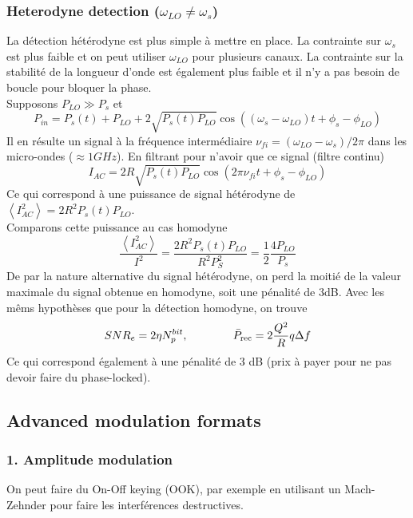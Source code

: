 \subsubsection{Heterodyne detection ($\omega_{LO}\neq\omega_s$)}
La détection hétérodyne est plus simple à mettre en place. La contrainte sur $\omega_s$ est plus
faible et on peut utiliser $\omega_{LO}$ pour plusieurs canaux. La contrainte sur la stabilité
de la longueur d'onde est également plus faible et il n'y a pas besoin de boucle pour bloquer
la phase. \\

Supposons $P_{LO}\gg P_s$ et
\begin{equation}
{P_{in}} = {P_s}(t) + {P_{LO}} + 2\sqrt {{P_s}(t){P_{LO}}} \cos \left( {({\omega _s} - {\omega _{LO}})t + {\phi _s} - {\phi _{LO}}} \right)
\end{equation}
Il en résulte un signal à la fréquence intermédiaire $\nu_{fi} = (\omega_{LO}-\omega_s)/2\pi$ 
dans les micro-ondes ($\approx 1GHz$). En filtrant pour n'avoir que ce signal (filtre continu)
\begin{equation}
{I_{AC}} = 2R\sqrt {{P_s}(t){P_{LO}}} \cos \left( {2\pi {\nu _{fi}}t + {\phi _s} - {\phi _{LO}}} \right)
\end{equation}
Ce qui correspond à une puissance de signal hétérodyne de $\left\langle {I_{AC}^2} \right\rangle 
 = 2{R^2}{P_s}(t){P_{LO}}$.\\
 
Comparons cette puissance au cas homodyne
\begin{equation}
\frac{{\left\langle {I_{AC}^2} \right\rangle }}{{{I^2}}} = \frac{{2{R^2}{P_s}(t){P_{LO}}}}{{{R^2}P_S^2}} = \frac{1}{2}\frac{{4{P_{LO}}}}{{{P_s}}}
\end{equation}
De par la nature alternative du signal hétérodyne, on perd la moitié de la valeur maximale du signal
obtenue en homodyne, soit une pénalité de 3dB. Avec les mêms hypothèses que pour la détection
homodyne, on trouve
\begin{equation}
SN{R_e} = 2\eta N_p^{bit},\qquad\qquad {\bar P_{{\rm{rec}}}} = 2\frac{{{Q^2}}}{R}q\Delta f
\end{equation}
Ce qui correspond également à une pénalité de 3 dB (prix à payer pour ne pas devoir faire du
phase-locked).


\subsection{Advanced modulation formats}
\subsubsection{1. Amplitude modulation}
On peut faire du On-Off keying (OOK), par exemple en utilisant un Mach-Zehnder pour faire les
interférences destructives.

